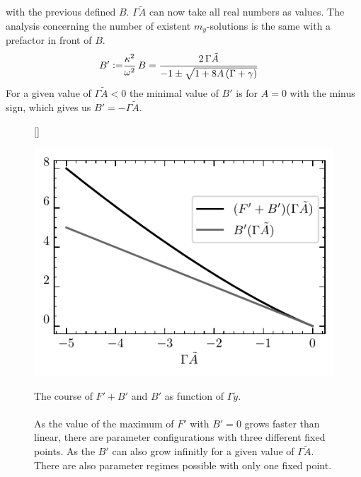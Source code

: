 \documentclass{article}
\begin{document}
with the previous defined $B$. $\Gamma \tilde{A}$ can now take all real numbers as values. The analysis concerning the number of existent $m_y$-solutions is the same with a prefactor in front of $B$. 
\begin{align*}
    B'\vcentcolon=&\frac{\kappa^2}{\omega^2}\,B=\frac{2\,\Gamma \tilde{A}}{-1\pm\sqrt{1+8A\,(\Gamma+\gamma)}}
\end{align*}
For a given value of $\Gamma\tilde{A}<0$ the minimal value of $B'$ is for $A=0$ with the minus sign, which gives us $B'=-\Gamma\tilde{A}$. 
\begin{figure}[H]
    [\FBwidth]
    {\caption{The course of $F'+B'$ and $B'$ as function of $\Gamma\tilde{y}$.\\\\As the value of the maximum of $F'$ with $B'=0$ grows faster than linear, there are parameter configurations with three different fixed points. As the $B'$ can also grow infinitly for a given value of $\Gamma\tilde{A}$. There are also parameter regimes possible with only one fixed point.}}
    {\includegraphics{pictures/numn_of_fixp.pdf}}
\end{figure}
\end{document}
